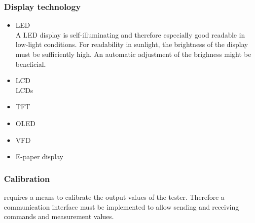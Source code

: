 \subsubsection{Display technology}
\begin{itemize}
     \item \acs{LED}
        \\
        A \ac{LED} display is self-illuminating and therefore especially good readable in low-light conditions. For readability in sunlight, the brightness of the display must be sufficiently high. An automatic adjustment of the brighness might be beneficial. 
    \item \acs{LCD}
        \\
        \acp{LCD}
    \item \acs{TFT}
        \\
    \item \acs{OLED}
        \\
    \item \acs{VFD}
        \\
    \item E-paper display
        \\
\end{itemize}

\subsubsection{Calibration}
 requires a means to calibrate the output values of the tester. Therefore a communication interface must be implemented to allow sending and receiving commands and measurement values. 


